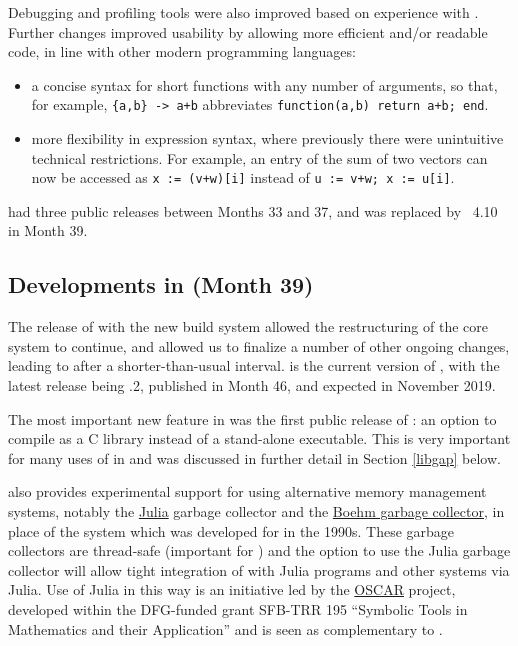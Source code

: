Debugging  and profiling tools were also improved based on experience with
. Further changes improved \GAP
usability by allowing more efficient and/or readable code, in line
with other modern programming languages:
\begin{itemize}
  \item a concise syntax for short
    functions with any number of arguments, so that, for example,
    \verb|{a,b} -> a+b| abbreviates \verb|function(a,b) return a+b; end|. 
\item more flexibility in \GAP expression syntax,
  where previously there were unintuitive technical restrictions. For
  example, an entry of the sum of two vectors can now be accessed as
  \verb|x := (v+w)[i]| instead of \verb|u := v+w; x := u[i]|.
  

\end{itemize}

 had three public releases between Months 33 and 37, and
was replaced by \GAP~4.10 in Month 39.

\subsection{Developments in  (Month 39)}\label{gap-4.10}

The release of  with the new build system allowed the
restructuring of the core \GAP system to continue, and allowed us to
finalize a number of other ongoing changes, leading to 
after a shorter-than-usual interval.  is the current
version of \GAP, with the latest release being .2, published
in Month 46, and  expected in November 2019.

The most important new feature in  was the first public
release of : an
option to compile \GAP as a C library instead of a stand-alone
executable. This is very important for many uses of \GAP in \ODK and
was discussed in further detail in Section \ref{libgap} below.

 also provides experimental support for using alternative
memory management systems, notably the \href{https://julialang.org/}{Julia} garbage
collector and the \href{http://www.hboehm.info/gc/}{Boehm garbage collector}, in place of the
 system which was developed for  in the 1990s.  These
garbage collectors are thread-safe (important for \HPCGAP) and the
option to use the Julia garbage collector will allow tight integration
of \GAP with Julia programs and other systems via Julia. Use of Julia
in this way is an initiative led by the
\href{https://oscar.computeralgebra.de/}{OSCAR} project, developed
within the DFG-funded grant SFB-TRR 195 ``Symbolic Tools in
Mathematics and their Application'' and is seen as complementary to \ODK.

